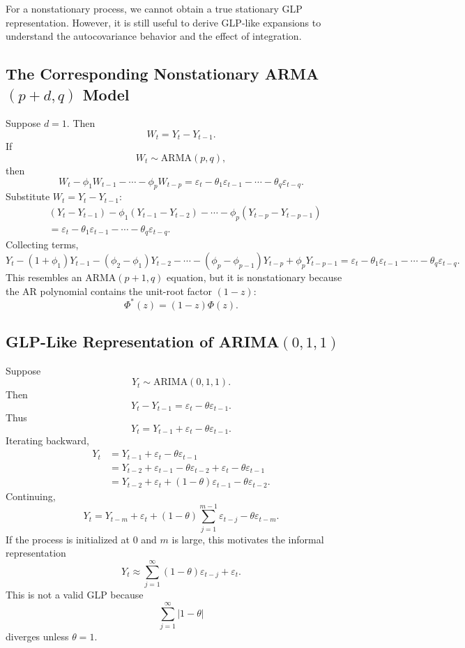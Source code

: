 \documentclass[12pt,oneside]{book}
\numberwithin{equation}{section}
\theoremstyle{definition}
\theoremstyle{plain}
\theoremstyle{remark}
\begin{document}
For a nonstationary process, we cannot obtain a true stationary GLP representation. However, it is still useful to derive GLP-like expansions to understand the autocovariance behavior and the effect of integration.

\subsection{The Corresponding Nonstationary ARMA$(p+d,q)$ Model}

Suppose $d=1$. Then
\[
W_t=Y_t-Y_{t-1}.
\]
If
\[
W_t\sim \mathrm{ARMA}(p,q),
\]
then
\[
W_t-\phi_1W_{t-1}-\cdots-\phi_pW_{t-p}
=
\varepsilon_t-\theta_1\varepsilon_{t-1}-\cdots-\theta_q\varepsilon_{t-q}.
\]
Substitute $W_t=Y_t-Y_{t-1}$:
\begin{align*}
&(Y_t-Y_{t-1})
-\phi_1(Y_{t-1}-Y_{t-2})
-\cdots
-\phi_p(Y_{t-p}-Y_{t-p-1}) \\
&=
\varepsilon_t-\theta_1\varepsilon_{t-1}-\cdots-\theta_q\varepsilon_{t-q}.
\end{align*}
Collecting terms,
\[
Y_t-(1+\phi_1)Y_{t-1}
-(\phi_2-\phi_1)Y_{t-2}
-\cdots
-(\phi_p-\phi_{p-1})Y_{t-p}
+\phi_pY_{t-p-1}
=
\varepsilon_t-\theta_1\varepsilon_{t-1}-\cdots-\theta_q\varepsilon_{t-q}.
\]
This resembles an ARMA$(p+1,q)$ equation, but it is nonstationary because the AR polynomial contains the unit-root factor $(1-z)$:
\[
\Phi^\ast(z)
=
(1-z)\Phi(z).
\]

\subsection*{GLP-Like Representation of ARIMA$(0,1,1)$}

Suppose
\[
Y_t\sim \mathrm{ARIMA}(0,1,1).
\]
Then
\[
Y_t-Y_{t-1}
=
\varepsilon_t-\theta\varepsilon_{t-1}.
\]
Thus
\[
Y_t
=
Y_{t-1}
+
\varepsilon_t
-
\theta\varepsilon_{t-1}.
\]
Iterating backward,
\begin{align*}
Y_t
&=
Y_{t-1}+\varepsilon_t-\theta\varepsilon_{t-1} \\
&=
Y_{t-2}+\varepsilon_{t-1}-\theta\varepsilon_{t-2}
+\varepsilon_t-\theta\varepsilon_{t-1} \\
&=
Y_{t-2}
+\varepsilon_t
+
(1-\theta)\varepsilon_{t-1}
-\theta\varepsilon_{t-2}.
\end{align*}
Continuing,
\[
Y_t
=
Y_{t-m}
+
\varepsilon_t
+
(1-\theta)\sum_{j=1}^{m-1}\varepsilon_{t-j}
-\theta\varepsilon_{t-m}.
\]
If the process is initialized at $0$ and $m$ is large, this motivates the informal representation
\[
Y_t
\approx
\sum_{j=1}^{\infty}(1-\theta)\varepsilon_{t-j}
+
\varepsilon_t.
\]
This is not a valid GLP because
\[
\sum_{j=1}^{\infty}|1-\theta|
\]
diverges unless $\theta=1$.
\end{document}

